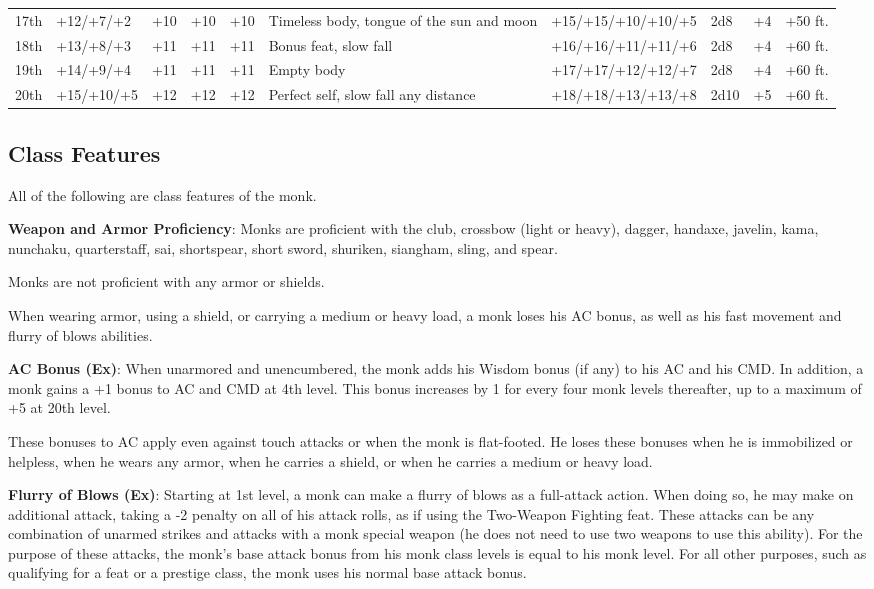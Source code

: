 \begin{table}[]
\begin{tabularx}{\linewidth}{lllllXllll}
17th & +12/+7/+2 & +10 & +10 & +10 & Timeless body, tongue of the sun and moon & +15/+15/+10/+10/+5 & 2d8 & +4 & +50 ft.\\
18th & +13/+8/+3 & +11 & +11 & +11 & Bonus feat, slow fall & +16/+16/+11/+11/+6 & 2d8 & +4 & +60 ft.\\
19th & +14/+9/+4 & +11 & +11 & +11 & Empty body & +17/+17/+12/+12/+7 & 2d8 & +4 & +60 ft.\\
20th & +15/+10/+5 & +12 & +12 & +12 & Perfect self, slow fall any distance & +18/+18/+13/+13/+8 & 2d10 & +5 & +60 ft.\\
\end{tabularx}
\end{table}

				
\subsection{Class Features}

				
All of the following are class features of the monk.
				
\textbf{Weapon and Armor Proficiency}: Monks are proficient with the club, crossbow (light or heavy), dagger, handaxe, javelin, kama, nunchaku, quarterstaff, sai, shortspear, short sword, shuriken, siangham, sling, and spear.
				
Monks are not proficient with any armor or shields.
				
When wearing armor, using a shield, or carrying a medium or heavy load, a monk loses his AC bonus, as well as his fast movement and flurry of blows abilities.
				
\textbf{AC Bonus (Ex)}: When unarmored and unencumbered, the monk adds his Wisdom bonus (if any) to his AC and his CMD. In addition, a monk gains a +1 bonus to AC and CMD at 4th level. This bonus increases by 1 for every four monk levels thereafter, up to a maximum of +5 at 20th level.
				
These bonuses to AC apply even against touch attacks or when the monk is flat-footed. He loses these bonuses when he is immobilized or helpless, when he wears any armor, when he carries a shield, or when he carries a medium or heavy load.
				
\textbf{Flurry of Blows (Ex)}: Starting at 1st level, a monk can make a flurry of blows as a full-attack action. When doing so, he may make on additional attack, taking a -2 penalty on all of his attack rolls, as if using the Two-Weapon Fighting feat. These attacks can be any combination of unarmed strikes and attacks with a monk special weapon (he does not need to use two weapons to use this ability). For the purpose of these attacks, the monk's base attack bonus from his monk class levels is equal to his monk level. For all other purposes, such as qualifying for a feat or a prestige class, the monk uses his normal base attack bonus. 
				

